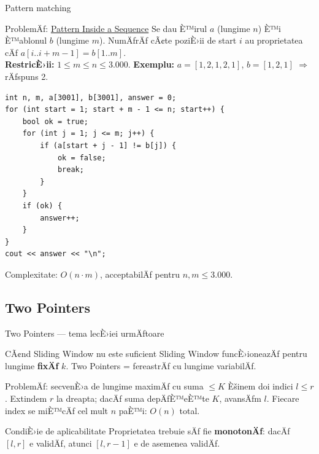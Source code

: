 \documentclass{beamer}
\begin{document}
\begin{frame}{Pattern matching}
  \begin{block}{ProblemÄƒ: \href{https://code.algolymp.com/problems/4205}{Pattern Inside a Sequence}}
    Se dau È™irul $a$ (lungime $n$) È™i È™ablonul $b$ (lungime $m$).
    NumÄƒrÄƒ cÃ¢te poziÈ›ii de start $i$ au proprietatea cÄƒ $a[i..i{+}m{-}1] = b[1..m]$.\\
    \textbf{RestricÈ›ii:} $1 \leq m \leq n \leq 3{.}000$.
    \textbf{Exemplu:} $a{=}[1,2,1,2,1]$, $b{=}[1,2,1]$ $\Rightarrow$ rÄƒspuns 2.
  \end{block}
  \begin{lstlisting}
int n, m, a[3001], b[3001], answer = 0;
for (int start = 1; start + m - 1 <= n; start++) {
    bool ok = true;
    for (int j = 1; j <= m; j++) {
        if (a[start + j - 1] != b[j]) {
            ok = false;
            break;
        }
    }
    if (ok) {
        answer++;
    }
}
cout << answer << "\n";
  \end{lstlisting}
  Complexitate: $O(n \cdot m)$, acceptabilÄƒ pentru $n, m \leq 3{.}000$.
\end{frame}

\subsection{Two Pointers}

\begin{frame}{Two Pointers --- tema lecÈ›iei urmÄƒtoare}
  \begin{block}{CÃ¢nd Sliding Window nu este suficient}
    Sliding Window funcÈ›ioneazÄƒ pentru lungime \textbf{fixÄƒ} $k$.
    Two Pointers = fereastrÄƒ cu lungime variabilÄƒ.
  \end{block}
  \begin{block}{ProblemÄƒ: secvenÈ›a de lungime maximÄƒ cu suma $\leq K$}
    Èšinem doi indici $l \leq r$. Extindem $r$ la dreapta; dacÄƒ suma depÄƒÈ™eÈ™te $K$,
    avansÄƒm $l$. Fiecare index se miÈ™cÄƒ cel mult $n$ paÈ™i: $O(n)$ total.
  \end{block}
  \begin{block}{CondiÈ›ie de aplicabilitate}
    Proprietatea trebuie sÄƒ fie \textbf{monotonÄƒ}: dacÄƒ $[l,r]$ e validÄƒ, atunci
    $[l, r{-}1]$ e de asemenea validÄƒ.
  \end{block}
\end{frame}

\end{document}
